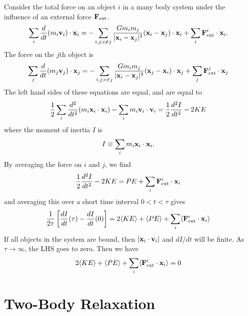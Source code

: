 \documentclass[]{article}
\begin{document}
Consider the total force on an object $i$ in 
a many body system under the influence of an external force $\mathbf{F}_{\mathrm{ext}}$.
\begin{equation}
\sum_i \frac{d}{dt} (m_i \mathbf{v}_i) \cdot \mathbf{x}_i = -\sum_{i,j; i\ne j} \frac{Gm_i m_j}{|\mathbf{x}_i - \mathbf{x}_j|^{3}} (\mathbf{x}_i - \mathbf{x}_j) \cdot \mathbf{x}_i + \sum_i \mathbf{F}_{\mathrm{ext}}^{i} \cdot \mathbf{x}_i.
\end{equation}
\noindent
The force on the $j$th object is
\begin{equation}
\sum_j \frac{d}{dt} (m_j \mathbf{v}_j) \cdot \mathbf{x}_j = - \sum_{i,j;i\ne j }\frac{G m_i m_j}{|\mathbf{x}_i - \mathbf{x}_j|^{3}}(\mathbf{x}_j - \mathbf{x}_i)\cdot\mathbf{x}_j + \sum_j \mathbf{F}_{\mathrm{ext}}^{j} \cdot \mathbf{x}_j
\end{equation}
\noindent
The left hand sides of these equations are equal, and are equal to
\begin{equation}
\frac{1}{2} \sum_i \frac{d^2}{dt^2}(m_i\mathbf{x}_i \cdot \mathbf{x}_i) - \sum_i m_i \mathbf{v}_i \cdot \mathbf{v}_i = \frac{1}{2} \frac{d^2I}{dt^2} -2 KE
\end{equation}
\noindent
where the moment of inertia $I$ is
\begin{equation}
I \equiv \sum_i m_i \mathbf{x}_i \cdot \mathbf{x}_i.
\end{equation}
\noindent
By averaging the force on $i$ and $j$, we find
\begin{equation}
\frac{1}{2} \frac{d^2 I}{dt^2} - 2 KE = PE + \sum_i \mathbf{F}_{\mathrm{ext}}^{i} \cdot \mathbf{x}_i
\end{equation}
\noindent
and averaging this over a short time interval $0<t<\tau$ gives
\begin{equation}
\frac{1}{2\tau}\left[ \frac{dI}{dt}(\tau) - \frac{dI}{dt}(0)\right] = 2 \langle KE\rangle + \langle PE\rangle + \sum_i \langle\mathbf{F}_{\mathrm{ext}}^{i} \cdot \mathbf{x}_i\rangle
\end{equation}
\noindent
If all objects in the system are bound, then $|\mathbf{x}_i \cdot \mathbf{v}_i|$ and $dI/dt$ will be finite.  As $\tau\to\infty$, the LHS goes to zero.  Then we have
\begin{equation}
2\langle KE\rangle + \langle PE\rangle + \sum_i \langle\mathbf{F}_{\mathrm{ext}}^{i} \cdot \mathbf{x}_i\rangle = 0
\end{equation}

\section{Two-Body Relaxation}
\end{document}

